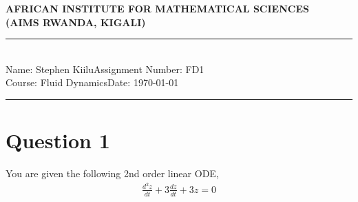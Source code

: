 \documentclass[12pt,a4paper]{article}
\newcommand{\student}{Stephen Kiilu}
\newcommand{\course}{Fluid Dynamics}
\newcommand{\assignment}{FD1}
\begin{document}
\thispagestyle{empty}
\begin{center}
\textbf{AFRICAN INSTITUTE FOR MATHEMATICAL SCIENCES \\[0.5cm]
(AIMS RWANDA, KIGALI)}
\vspace{1.0cm}
\end{center}

\noindent
\rule{17cm}{0.2cm}\\[0.3cm]
Name: \student \hfill Assignment Number: \assignment\\[0.1cm]
Course: \course \hfill Date: \today\\
\rule{17cm}{0.05cm}
\vspace{1.0cm}

\section*{Question 1}
You are given the following 2nd order linear ODE,
\begin{eqnarray*}
\frac{d^2z}{dt}+3\frac{dz}{dt}+3z=0
\end{eqnarray*}
\end{document}

